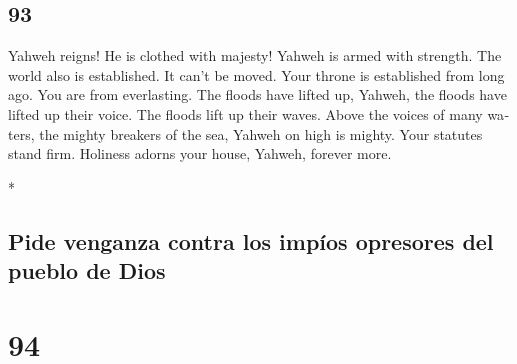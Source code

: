 \begin{paracol}{2}
\switchcolumn
\begin{otherlanguage}{english}

\hypertarget{section-185}{%
\section{93}\label{section-185}}

 Yahweh reigns! He is clothed with majesty! Yahweh is
armed with strength. The world also is established. It can't be moved.
 Your throne is established from long ago. You are from
everlasting.  The floods have lifted up, Yahweh, the
floods have lifted up their voice. The floods lift up their waves.
 Above the voices of many waters, the mighty breakers of
the sea, Yahweh on high is mighty.  Your statutes stand
firm. Holiness adorns your house, Yahweh, forever more.

\end{otherlanguage}

\switchcolumn[0]*

\hypertarget{pide-venganza-contra-los-impuxedos-opresores-del-pueblo-de-dios}{%
\subsection{Pide venganza contra los impíos opresores del pueblo de
Dios}\label{pide-venganza-contra-los-impuxedos-opresores-del-pueblo-de-dios}}

\hypertarget{section-186}{%
\section{94}\label{section-186}}


\end{paracol}
